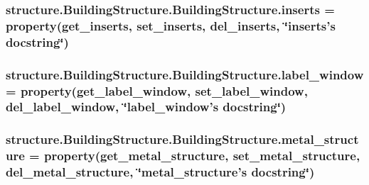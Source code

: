 \hypertarget{classstructure_1_1_building_structure_1_1_building_structure_aa3ec73a313035fb4eabaaefa1200b64e}{
\subsubsection[{inserts}]{\setlength{\rightskip}{0pt plus 5cm}structure.\-Building\-Structure.\-Building\-Structure.\-inserts = property({\bf get\-\_\-inserts}, {\bf set\-\_\-inserts}, {\bf del\-\_\-inserts}, \char`\"{}inserts's docstring\char`\"{})\hspace{0.3cm}{\ttfamily [static]}}}\label{classstructure_1_1_building_structure_1_1_building_structure_aa3ec73a313035fb4eabaaefa1200b64e}
\hypertarget{classstructure_1_1_building_structure_1_1_building_structure_a343d2c4340107f7c4e5a4fe1a97090b6}{
\subsubsection[{label\-\_\-window}]{\setlength{\rightskip}{0pt plus 5cm}structure.\-Building\-Structure.\-Building\-Structure.\-label\-\_\-window = property({\bf get\-\_\-label\-\_\-window}, {\bf set\-\_\-label\-\_\-window}, {\bf del\-\_\-label\-\_\-window}, \char`\"{}label\-\_\-window's docstring\char`\"{})\hspace{0.3cm}{\ttfamily [static]}}}\label{classstructure_1_1_building_structure_1_1_building_structure_a343d2c4340107f7c4e5a4fe1a97090b6}
\hypertarget{classstructure_1_1_building_structure_1_1_building_structure_a7e7ae4e752e5ab9e20c99fc2a6fdfa85}{
\subsubsection[{metal\-\_\-structure}]{\setlength{\rightskip}{0pt plus 5cm}structure.\-Building\-Structure.\-Building\-Structure.\-metal\-\_\-structure = property({\bf get\-\_\-metal\-\_\-structure}, {\bf set\-\_\-metal\-\_\-structure}, {\bf del\-\_\-metal\-\_\-structure}, \char`\"{}metal\-\_\-structure's docstring\char`\"{})\hspace{0.3cm}{\ttfamily [static]}}}\label{classstructure_1_1_building_structure_1_1_building_structure_a7e7ae4e752e5ab9e20c99fc2a6fdfa85}
